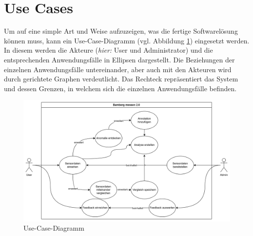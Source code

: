\section{Use Cases}
Um auf eine simple Art und Weise aufzuzeigen, was die fertige Softwarelösung können muss, kann ein Use-Case-Diagramm (vgl. Abbildung \ref{fig:usecase_diagram}) eingesetzt werden. In diesem werden die Akteure (\textit{hier:} User und Administrator) und die entsprechenden Anwendungsfälle in Ellipsen dargestellt. Die Beziehungen der einzelnen Anwendungsfälle untereinander, aber auch mit den Akteuren wird durch gerichtete Graphen verdeutlicht. Das Rechteck repräsentiert das System und dessen Grenzen, in welchem sich die einzelnen Anwendungsfälle befinden. 

\begin{figure}[t]
    \centering
    \includegraphics[width=1.5\textwidth]{figures/usecases.png}
    \decoRule
    \caption[Use-Case-Diagramm]{Use-Case-Diagramm}
    \label{fig:usecase_diagram}
\end{figure}
